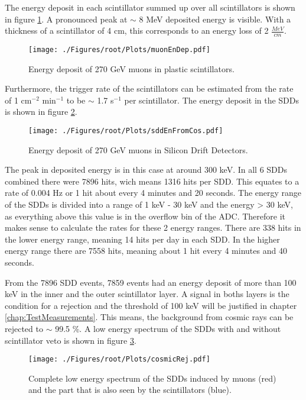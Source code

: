 The energy deposit in each scintillator summed up over all scintillators is shown in figure \ref{fig:muEnDepScin}. A pronounced peak at $\sim$ 8 MeV deposited energy is visible. With a thickness of a scintillator of 4 cm, this corresponds to an energy loss of 2 $\frac{MeV}{cm}$. 
\begin{figure}[h]
 \centering
 \texttt{[image: ./Figures/root/Plots/muonEnDep.pdf]}
 \caption{Energy deposit of 270 GeV muons in plastic scintillators.}
 \label{fig:muEnDepScin}
\end{figure}
Furthermore, the trigger rate of the scintillators can be estimated from the rate of 1 cm$^{-2}$ min$^{-1}$ to be $\sim$ 1.7 s$^{-1}$ per scintillator. The energy deposit in the SDDs is shown in figure \ref{fig:muEnDepSDD}.
\begin{figure}[h]
 \centering
 \texttt{[image: ./Figures/root/Plots/sddEnFromCos.pdf]}
 \caption{Energy deposit of 270 GeV muons in Silicon Drift Detectors.}
 \label{fig:muEnDepSDD}
\end{figure}
The peak in deposited energy is in this case at around 300 keV. In all 6 SDDs combined there were 7896 hits, wich means 1316 hits per SDD. This equates to a rate of 0.004 Hz or 1 hit about every 4 minutes and 20 seconds. The energy range of the SDDs is divided into a range of 1 keV - 30 keV and the energy > 30 keV, as everything above this value is in the overflow bin of the ADC. Therefore it makes sense to calculate the rates for these 2 energy ranges. There are 338 hits in the lower energy range, meaning 14 hits per day in each SDD. In the higher energy range there are 7558 hits, meaning about 1 hit every 4 minutes and 40 seconds.

From the 7896 SDD events, 7859 events had an energy deposit of more than 100 keV in the inner and the outer scintillator layer. A signal in boths layers is the condition for a rejection and the threshold of 100 keV will be justified in chapter \ref{chap:TestMeasurements}. This means, the background from cosmic rays can be rejected to $\sim$ 99.5 \%. A low energy spectrum of the SDDs with and without scintillator veto is shown in figure \ref{fig:scintVeto}.
\begin{figure}[h]
 \centering
 \texttt{[image: ./Figures/root/Plots/cosmicRej.pdf]}
 \caption{Complete low energy spectrum of the SDDs induced by muons (red) and the part that is also seen by the scintillators (blue).}
 \label{fig:scintVeto}
\end{figure}

